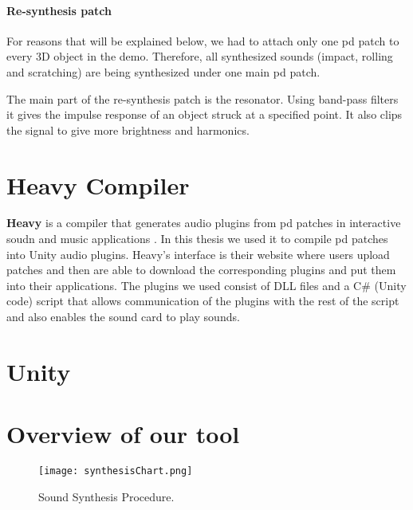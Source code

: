 \paragraph{Re-synthesis patch\\}
For reasons that will be explained below, we had to attach only one pd patch to every 3D object in the demo. Therefore, all synthesized sounds (impact, rolling and scratching) are being synthesized under one main pd patch. 

The main part of the re-synthesis patch is the resonator. Using band-pass filters it gives the impulse response of an object struck at a specified point. It also clips the signal to give more brightness and harmonics. 

\section{Heavy Compiler}
\textbf{Heavy} is a compiler that generates audio plugins from pd patches in interactive soudn and music applications \cite{bib:heavy}. In this thesis we used it to compile pd patches into Unity audio plugins. Heavy's interface is their website where users upload patches and then are able to download the corresponding plugins and put them into their applications. The plugins we used consist of DLL files and a C\# (Unity code) script that allows communication of the plugins with the rest of the script and also enables the sound card to play sounds.

\section{Unity\textregistered}

\section{Overview of our tool}
\begin{figure}[H]
  \centering
    \texttt{[image: synthesisChart.png]}
      \caption{Sound Synthesis Procedure.}
      \label{fig:synth_proc}
\end{figure}